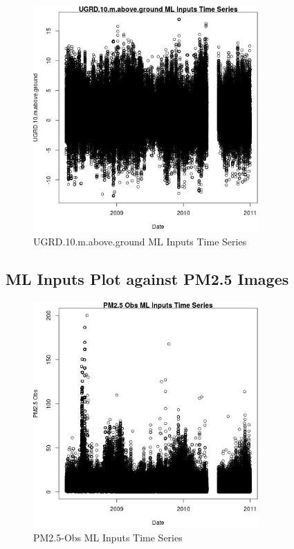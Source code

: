\begin{figure} 
\centering  
\includegraphics[width=0.77\textwidth]{Code_Outputs/ML_input_report_ML_input_PM25_Step5_part_d_de_duplicated_aves_ML_inputpdfs_UGRD10mabovegroundvDate.jpg} 
\caption{\label{fig:ML_input_report_ML_input_PM25_Step5_part_d_de_duplicated_aves_ML_inputpdfsUGRD10mabovegroundvDate}UGRD.10.m.above.ground ML Inputs Time Series} 
\end{figure} 
 

\subsection{ML Inputs Plot against PM2.5 Images} 
 

\begin{figure} 
\centering  
\includegraphics[width=0.77\textwidth]{Code_Outputs/ML_input_report_ML_input_PM25_Step5_part_d_de_duplicated_aves_ML_inputpdfs_PM25_ObsvDate.jpg} 
\caption{\label{fig:ML_input_report_ML_input_PM25_Step5_part_d_de_duplicated_aves_ML_inputpdfsPM25_ObsvDate}PM2.5-Obs ML Inputs Time Series} 
\end{figure} 
 

